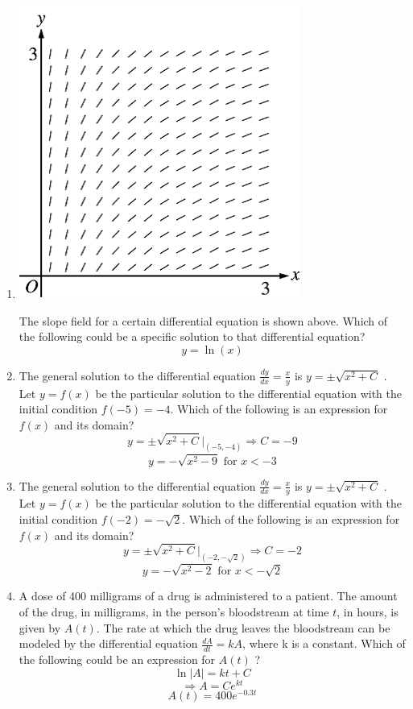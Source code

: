 \documentclass[12pt]{article}
\begin{document}
\begin{enumerate}
\item 
\begin{center}
    \includegraphics[scale=0.75]{original-5.png}
\end{center}
The slope field for a certain differential equation is shown above. Which of the following could be a specific solution to that differential equation?
$$\boxed{y=\ln(x)}$$

\item The general solution to the differential equation $\frac{dy}{dx}=\frac{x}{y}$ is $y=\pm \sqrt{x^2+C}$ . Let $y=f(x)$ be the particular solution to the differential equation with the initial condition $f(-5)=-4$. Which of the following is an expression for $f(x)$ and its domain?
$$y=\pm \sqrt{x^2+C} \biggr\rvert_{(-5,-4)} \Longrightarrow C=-9$$
$$\boxed{y=-\sqrt{x^2-9} \text{ for } x<-3}$$ 

\item The general solution to the differential equation $\frac{dy}{dx}=\frac{x}{y}$ is $y=\pm \sqrt{x^2+C}$ . Let $y=f(x)$ be the particular solution to the differential equation with the initial condition $f(-2)=-\sqrt{2}$. Which of the following is an expression for $f(x)$ and its domain?
$$y=\pm \sqrt{x^2+C} \biggr\rvert_{(-2,-\sqrt{2})} \Longrightarrow C=-2$$
$$\boxed{y=-\sqrt{x^2-2} \text{ for } x<-\sqrt{2}}$$ 

\item A dose of 400 milligrams of a drug is administered to a patient. The amount of the drug, in milligrams, in the person’s bloodstream at time $t$, in hours, is given by $A(t)$. The rate at which the drug leaves the bloodstream can be modeled by the differential equation $\frac{dA}{dt}=kA$, where k is a constant. Which of the following could be an expression for $A(t)$ ?
$$\ln|A|=kt+C$$
$$\Longrightarrow A=Ce^{kt}$$
$$\boxed{A(t)=400e^{-0.3t}}$$


\end{enumerate}
\end{document}
